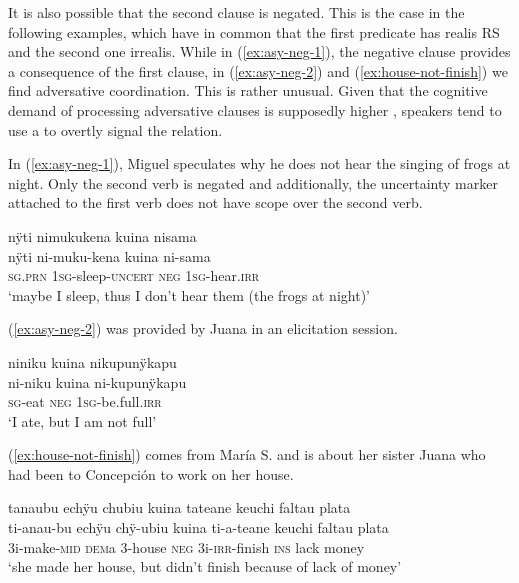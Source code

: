 
It is also possible that the second clause is negated. This is the case in the following examples, which have in common that the first predicate has realis RS and the second one irrealis. While in (\ref{ex:asy-neg-1}), the negative clause provides a consequence of the first clause, in (\ref{ex:asy-neg-2}) and (\ref{ex:house-not-finish}) we find adversative coordination. This is rather unusual. Given that the cognitive demand of processing adversative clauses is supposedly higher \citep[cf.][304--305]{Matras1998}, speakers tend to use a  to overtly signal the relation. 

In (\ref{ex:asy-neg-1}), Miguel speculates why he does not hear the singing of frogs at night. Only the second verb is negated and additionally, the uncertainty marker attached to the first verb does not have scope over the second verb.

\ea\label{ex:asy-neg-1}
\begingl
\glpreamble nÿti nimukukena kuina nisama\\
\gla nÿti ni-muku-kena kuina ni-sama\\
\textsc{sg.prn} 1\textsc{sg}-sleep-\textsc{uncert} \textsc{neg} 1\textsc{sg}-hear.\textsc{irr}\\
\glft ‘maybe I sleep, thus I don’t hear them (the frogs at night)’
\endgl
\trailingcitation{[mqx-p110826l.622]}
\xe

(\ref{ex:asy-neg-2}) was provided by Juana in an elicitation session.

\ea\label{ex:asy-neg-2}
\begingl
\glpreamble niniku kuina nikupunÿkapu\\
\gla ni-niku kuina ni-kupunÿkapu\\
\textsc{sg}-eat \textsc{neg} 1\textsc{sg}-be.full.\textsc{irr}\\
\glft ‘I ate, but I am not full’
\endgl
\trailingcitation{[jxx-e150925l-1.015]}
\xe

(\ref{ex:house-not-finish}) comes from María S. and is about her sister Juana who had been to Concepción to work on her house.

\ea\label{ex:house-not-finish}
\begingl
\glpreamble tanaubu echÿu chubiu kuina tateane keuchi faltau plata\\
\gla ti-anau-bu echÿu chÿ-ubiu kuina ti-a-teane keuchi faltau plata\\
\glb 3i-make-\textsc{mid} \textsc{dem}a 3-house \textsc{neg} 3i-\textsc{irr}-finish \textsc{ins} lack money\\
\glft ‘she made her house, but didn’t finish because of lack of money’
\endgl
\trailingcitation{[rxx-e120511l.115]}
\xe

